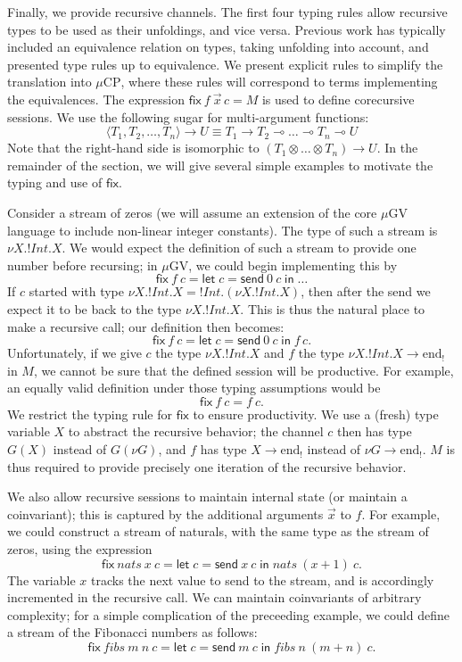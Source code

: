 \documentclass[orivec,envcountsame]{llncs}
\newcommand{\gvout}[2]{{!#1.#2}}
\newcommand{\lto}{\ensuremath{\multimap}}
\newcommand{\uto}{\ensuremath{\rightarrow}}
\newcommand{\outterm}{\mathrm{end}_!}
\newcommand{\mkwd}[1]{\mathsf{#1}}
\newcommand{\gvsend}[2]{\mkwd{send}\:#1\:#2}
\newcommand{\gvlet}[3]{\mkwd{let}\;#1 = #2\;\mkwd{in}\;#3}
\newcommand{\lrkwd}{\mkwd{fix}}
\newcommand{\gvfix}[3]{\lrkwd\:#1\:#2 = #3}
\newcommand{\mucp}{$\mu\mathrm{CP}$\xspace}
\newcommand{\mugv}{$\mu\mathrm{GV}$\xspace}
\begin{document}
Finally, we provide recursive channels. The first four typing rules allow recursive types to be used
as their unfoldings, and vice versa. Previous work has typically included an equivalence relation on
types, taking unfolding into account, and presented type rules up to equivalence. We present
explicit rules to simplify the translation into \mucp, where these rules will correspond to terms
implementing the equivalences. The expression $\gvfix{f}{\vec{x}\,c}{M}$ is used to define
corecursive sessions.  We use the following sugar for multi-argument functions:
\[
  \langle T_1, T_2, \dots, T_n \rangle \uto U \equiv T_1 \uto T_2 \lto \dots \lto T_n \lto U
\]
Note that the right-hand side is isomorphic to $(T_1 \otimes \dots \otimes T_n) \uto U$.  In the
remainder of the section, we will give several simple examples to motivate the typing and use of
$\lrkwd$.

Consider a stream of zeros (we will assume an extension of the core \mugv language to include
non-linear integer constants).  The type of such a stream is $\nu X. !Int.X$.  We would expect the
definition of such a stream to provide one number before recursing; in \mugv, we could begin
implementing this by
\[
  \lrkwd \: f\:c = \gvlet{c}{\gvsend{0}{c}}{\dots}
\]
If $c$ started with type $\nu X.\gvout{Int}{X} = \gvout{Int}{(\nu X.\gvout{Int}{X})}$, then after
the send we expect it to be back to the type $\nu X.\gvout{Int}{X}$.  This is thus the natural place
to make a recursive call; our definition then becomes:
\[ \lrkwd \: f\:c = \gvlet{c}{\gvsend{0}{c}}{f\,c}.\]
Unfortunately, if we give $c$ the type $\nu X.\gvout{Int}{X}$ and $f$ the type $\nu X.\gvout{Int}{X}
\uto \outterm$ in $M$, we cannot be sure that the defined session will be productive.  For example,
an equally valid definition under those typing assumptions would be
\[ \lrkwd \: f\:c = f\:c.\]
We restrict the typing rule for $\lrkwd$ to ensure productivity.  We use a (fresh) type variable $X$
to abstract the recursive behavior; the channel $c$ then has type $G(X)$ instead of $G(\nu G)$, and
$f$ has type $X \uto \outterm$ instead of $\nu G \uto \outterm$.  $M$ is thus required to provide
precisely one iteration of the recursive behavior.

We also allow recursive sessions to maintain internal state (or maintain a coinvariant); this is
captured by the additional arguments $\vec{x}$ to $f$.  For example, we could construct a stream of
naturals, with the same type as the stream of zeros, using the expression
\[
  \gvfix{nats}{x\:c}{\gvlet{c}{\gvsend{x}{c}}{nats\:(x + 1)\:c}}.
\]
The variable $x$ tracks the next value to send to the stream, and is accordingly incremented in the
recursive call.  We can maintain coinvariants of arbitrary complexity; for a simple complication of
the preceeding example, we could define a stream of the Fibonacci numbers as follows:
\[
  \gvfix{fibs}{m\:n\:c}{\gvlet{c}{\gvsend{m}{c}}{fibs\:n\:(m + n)\:c}}.
\]
\end{document}
